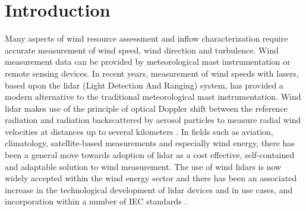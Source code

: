 \documentclass[remotesensing,article,submit,pdftex,moreauthors]{Definitions/mdpi}
\begin{document}



\section{Introduction}
Many aspects of wind resource assessment and inflow characterization require accurate measurement of wind speed, wind direction and turbulence. Wind measurement data can be provided by meteorological mast instrumentation or remote sensing devices. In recent years, measurement of wind speeds with lasers, based upon the lidar (Light Detection And Ranging) system, has provided a modern alternative to the traditional meteorological mast instrumentation. Wind lidar makes use of the principle of optical Doppler shift between the reference radiation and radiation backscattered by aerosol particles to measure radial wind velocities at distances up to several kilometers \cite{Pena_Hasager_2010,ref-Liu, vanDooren2020,Shangguan_2022}.
In fields such as aviation, climatology, satellite-based measurements and especially wind energy, there has been a general move towards adoption of lidar as a cost effective, self-contained and adaptable solution to wind measurement.
The use of wind lidars is now widely accepted within the wind energy sector and there has been an associated increase in the technological development of lidar devices and in use cases, and incorporation within a number of IEC standards \cite{ref-IEC61400-12-1, ref-IEC61400-50-2, ref-IEC61400-50-3}.
\end{document}
